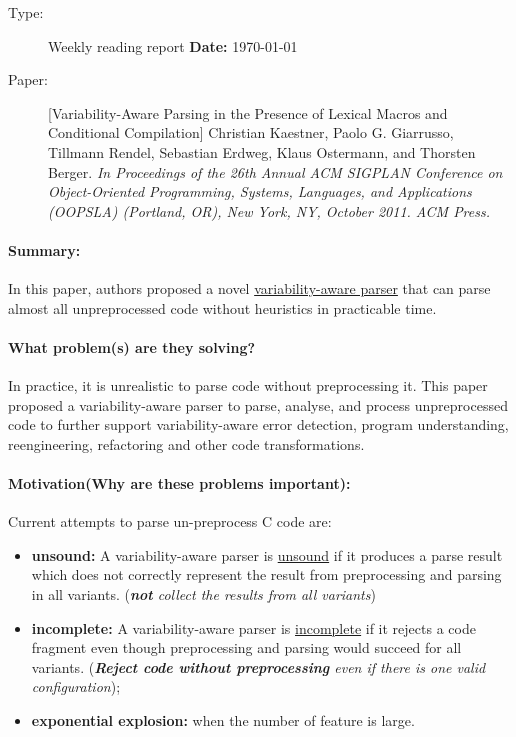 \documentclass[12pt]{article}
\begin{document}
\thispagestyle{empty}

\begin{description}
\item[Type:] Weekly reading report  \hfill {\bf Date:} \today
\item[Paper:] [Variability-Aware Parsing in the Presence of Lexical Macros and Conditional Compilation] Christian Kaestner, Paolo G. Giarrusso, Tillmann Rendel, Sebastian Erdweg, Klaus Ostermann, and Thorsten Berger. \emph{In Proceedings of the 26th Annual ACM SIGPLAN Conference on Object-Oriented Programming, Systems, Languages, and Applications (OOPSLA) (Portland, OR), New York, NY, October 2011. ACM Press.} 
\end{description}

\paragraph{Summary:}
In this paper, authors proposed a novel \underline{variability-aware parser} that can parse almost all unpreprocessed code without heuristics in practicable time.

\paragraph{What problem(s) are they solving?} In practice, it is unrealistic to parse code without preprocessing it. This paper proposed a variability-aware parser to parse, analyse, and process unpreprocessed code to further support variability-aware error detection, program understanding, reengineering, refactoring and other code transformations.

\paragraph{Motivation(Why are these problems important):} Current attempts to parse un-preprocess C code are:
\begin{itemize}
	\item \textbf{unsound:} A variability-aware parser is \underline{unsound} if it produces a parse result which does not correctly represent the result from preprocessing and parsing in all variants. (\emph{\textbf{not} collect the results from all variants}) 
	\item \textbf{incomplete:} A variability-aware parser is \underline{incomplete} if it rejects a code fragment even though preprocessing and parsing would succeed for all variants. (\emph{\textbf{Reject code without preprocessing} even if there is one valid configuration});
	\item \textbf{exponential explosion:} when the number of feature is large.
\end{itemize}
\end{document}

